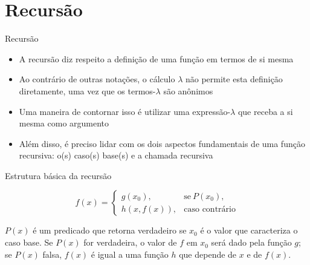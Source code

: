\section{Recursão}

\begin{frame}[fragile]{Recursão}

    \begin{itemize}
        \item A recursão diz respeito a definição de uma função em termos de si mesma

        \item Ao contrário de outras notações, o cálculo $\lambda$ não permite esta definição
            diretamente, uma vez que os termos-$\lambda$ são anônimos

        \item Uma maneira de contornar isso é utilizar uma expressão-$\lambda$ que receba a 
            si mesma como argumento

        \item Além disso, é preciso lidar com os dois aspectos fundamentais de uma função
            recursiva: o(s) caso(s) base(s) e a chamada recursiva
    \end{itemize}

\end{frame}

\begin{frame}[fragile]{Estrutura básica da recursão}

    \begin{huge}
    \[
        f(x) =  \left\lbrace \begin{array}{ll}
                    g(x_0), & \mbox{se}\ P(x_0), \\
                    h(x, f(x)), & \mbox{caso contrário}
                \end{array} \right.
    \]
    \end{huge}

    \vspace{0.5in}

    $P(x)$ é um predicado que retorna verdadeiro se $x_0$ é o valor que caracteriza o caso base.
    Se $P(x)$ for verdadeira, o valor de $f$ em $x_0$ será dado pela função $g$; se $P(x)$ falsa, 
    $f(x)$ é igual a uma função $h$ que depende de $x$ e de $f(x)$.
\end{frame}

